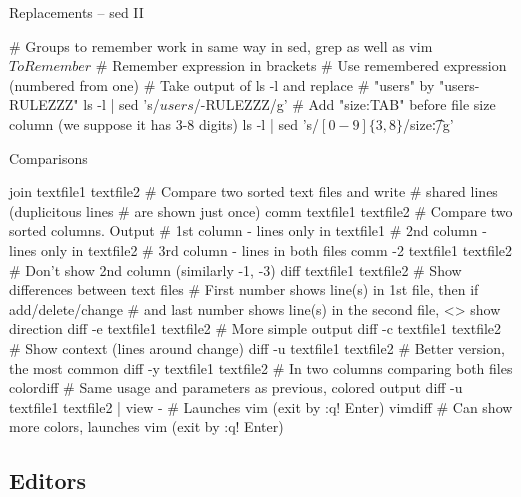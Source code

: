\documentclass[compress, ucs, xelatex, 11pt, xcolor=svgnames,
  hyperref={
    bookmarks=true,
    unicode=true,
    colorlinks=true,
    pdftitle={Linux, command line and MetaCentrum},
    plainpages=false,
    pdfauthor={Vojtech Zeisek},
    pdfsubject={Course about use of Linux command line, writing shell scripts and using MetaCentrum of CESNET},
    pdfcreator={XeLaTeX},
    pdfkeywords={Linux, GNU, BASH, shell, command line, MetaCentrum},
    linkcolor=Red,
    anchorcolor=Blue,
    citecolor=Purple,
    filecolor=DodgerBlue,
    menucolor=DarkOrchid,
    urlcolor=DeepSkyBlue,
    pdftex},
  url={hyphens, lowtilde} %
  ]{beamer}
\begin{document}
\begin{frame}[fragile]{Replacements -- sed II}
  \begin{bashcode}
    # Groups to remember work in same way in sed, grep as well as vim
    \(ToRemember\) # Remember expression in brackets
    \Number # Use remembered expression (numbered from one)
    # Take output of ls -l and replace # "users" by "users-RULEZZZ"
    ls -l | sed 's/\(users\)/\1-RULEZZZ/g'
    # Add "size:TAB" before file size column (we suppose it has 3-8 digits)
    ls -l | sed 's/\([0-9]\{3,8\}\)/size:\t\1/g'
  \end{bashcode}
\end{frame}

\begin{frame}[fragile]{Comparisons}
  \begin{bashcode}
    join textfile1 textfile2 # Compare two sorted text files and write
                             # shared lines (duplicitous lines 
                             # are shown just once)
    comm textfile1 textfile2 # Compare two sorted columns. Output
      # 1st column - lines only in textfile1
      # 2nd column - lines only in textfile2
      # 3rd column - lines in both files
    comm -2 textfile1 textfile2 # Don't show 2nd column (similarly -1, -3)
    diff textfile1 textfile2 # Show differences between text files
      # First number shows line(s) in 1st file, then if add/delete/change
      # and last number shows line(s) in the second file, <> show direction
    diff -e textfile1 textfile2 # More simple output
    diff -c textfile1 textfile2 # Show context (lines around change)
    diff -u textfile1 textfile2 # Better version, the most common
    diff -y textfile1 textfile2 # In two columns comparing both files
    colordiff # Same usage and parameters as previous, colored output
    diff -u textfile1 textfile2 | view - # Launches vim (exit by :q! Enter)
    vimdiff # Can show more colors, launches vim (exit by :q! Enter)
  \end{bashcode}
\end{frame}

\subsection{Editors} 
\end{document}
